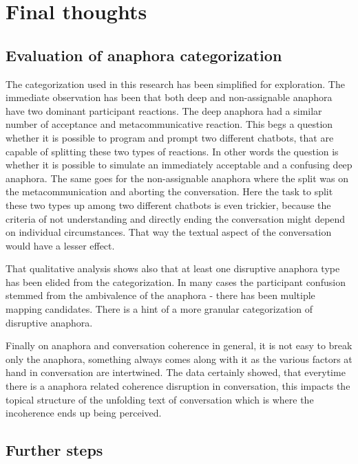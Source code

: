\documentclass[12pt]{report}
\begin{document}
{

\chapter{Final thoughts}

\section{Evaluation of anaphora categorization}

    The categorization used in this research has been simplified for exploration.
    The immediate observation has been that both deep and non-assignable anaphora
    have two dominant participant reactions.
    The deep anaphora had a similar number of acceptance and metacommunicative reaction.
    This begs a question whether it is possible to program and prompt two different chatbots,
    that are capable of splitting these two types of reactions.
    In other words the question is whether it is possible to simulate an immediately acceptable
    and a confusing deep anaphora.
    The same goes for the non-assignable anaphora
    where the split was on the metacommunication and aborting the conversation.
    Here the task to split these two types up among two different chatbots is even trickier,
    because the criteria of not understanding and directly ending the conversation might depend on
    individual circumstances.
    That way the textual aspect of the conversation would have a lesser effect.

    That qualitative analysis shows also that
    at least one disruptive anaphora type has been elided from the categorization.
    In many cases the participant confusion stemmed from the ambivalence of the anaphora -
    there has been multiple mapping candidates.
    There is a hint of a more granular categorization of disruptive anaphora.

    Finally on anaphora and conversation coherence in general,
    it is not easy to break only the anaphora,
    something always comes along with it as the various factors at hand in conversation are intertwined.
    The data certainly showed, that everytime there is a anaphora related coherence disruption in conversation,
    this impacts the topical structure of the unfolding text of conversation
    which is where the incoherence ends up being perceived.

\section{Further steps}


}
\end{document}
